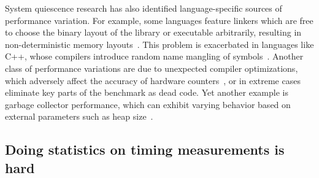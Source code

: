 \documentclass[conference]{IEEEtran}
\begin{document}
System quiescence research has also identified language-specific sources of performance
variation. For example, some languages feature linkers which are free to choose the binary
layout of the library or executable arbitrarily, resulting in non-deterministic memory
layouts~\cite{Georges2008}. This problem is exacerbated in languages like C++, whose
compilers introduce random name mangling of symbols~\cite{Kalibera2005}. Another class of
performance variations are due to unexpected compiler optimizations, which adversely affect
the accuracy of hardware counters~\cite{Zaparanuks2009}, or in extreme cases eliminate key
parts of the benchmark as dead code. Yet another example is garbage collector performance,
which can exhibit varying behavior based on external parameters such as heap
size~\cite{Blackburn2004}.

\subsection{Doing statistics on timing measurements is hard}
\label{sec:toughstats}
\end{document}

